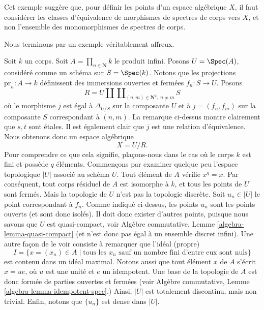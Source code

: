 \noindent
Cet exemple suggère que, pour définir les points d'un espace algébrique
$X$, il faut considérer les classes d'équivalence de morphismes de spectres
de corps vers $X$, et non l'ensemble des monomorphismes de spectres de corps.

\medskip\noindent
Nous terminons par un exemple véritablement affreux.

\begin{example}
\label{example-infinite-product}
Soit $k$ un corps.
Soit $A = \prod_{n \in \mathbf{N}} k$ le produit infini.
Posons $U = \Spec(A)$, considéré comme un schéma sur $S = \Spec(k)$.
Notons que les projections $\text{pr}_n : A \to k$ définissent des immersions
ouvertes et fermées $f_n : S \to U$. Posons
$$
R = U \amalg \coprod\nolimits_{(n, m) \in \mathbf{N}^2, \ n \not = m} S
$$
où le morphisme $j$ est égal à $\Delta_{U/S}$ sur la composante $U$
et à $j = (f_n, f_m)$ sur la composante $S$ correspondant à $(n, m)$.
La remarque ci-dessus montre clairement que $s, t$ sont \'etales.
Il est également clair que $j$ est une relation d'équivalence. Nous
obtenons donc un espace algébrique
$$
X = U/R.
$$
Pour comprendre ce que cela signifie, plaçons-nous dans le cas où
le corps $k$ est fini et possède $q$ éléments. Commençons par
examiner quelque peu l'espace topologique $|U|$ associé au schéma $U$.
Tout élément de $A$ vérifie $x^q = x$.
Par conséquent, tout corps résiduel de $A$ est isomorphe à $k$, et
tous les points de $U$ sont fermés. Mais la topologie de $U$ n'est pas
la topologie discrète. Soit $u_n \in |U|$ le point correspondant
à $f_n$. Comme indiqué ci-dessus, les points $u_n$ sont
les points ouverts (et sont donc isolés). Il doit donc exister
d'autres points, puisque nous savons que $U$ est quasi-compact, voir
Algèbre commutative, Lemme \ref{algebra-lemma-quasi-compact}
(et n'est donc pas égal à un ensemble discret infini).
Une autre façon de le voir consiste à remarquer que l'idéal (propre)
$$
I =
\{x = (x_n) \in A \mid \text{tous les }x_n\text{ sauf un nombre fini d'entre eux sont nuls}\}
$$
est contenu dans un idéal maximal. Notons aussi que tout élément
$x$ de $A$ s'écrit $x = ue$, où $u$ est une unité et $e$ un
idempotent. Une base de la topologie de $A$ est donc formée de parties ouvertes et
fermées (voir Algèbre commutative, Lemme \ref{algebra-lemma-idempotent-spec}.)
Ainsi, $|U|$ est totalement discontinu, mais non trivial.
Enfin, notons que $\{u_n\}$ est dense dans $|U|$.


\end{example}
